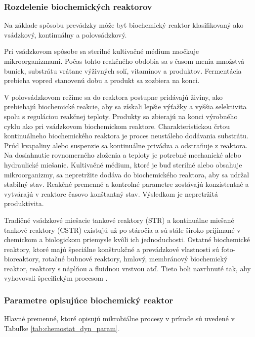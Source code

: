 \subsubsection{Rozdelenie biochemických reaktorov}
Na základe spôsobu prevádzky môže byť biochemický reaktor klasifikovaný ako vsádzkový, kontinuálny a polovsádzkový.
 
Pri vsádzkovom spôsobe sa sterilné kultivačné médium naočkuje mikroorganizmami. Počas tohto reakčného obdobia sa s časom menia množstvá buniek, substrátu vrátane výživných solí, vitamínov a produktov. Fermentácia prebieha vopred stanovenú dobu a produkt sa zozbiera na konci.

V polovsádzkovom režime sa do reaktora postupne pridávajú živiny, ako prebiehajú biochemické reakcie, aby sa získali lepšie výťažky a vyššia selektivita spolu s reguláciou reakčnej teploty. Produkty sa zbierajú na konci výrobného cyklu ako pri vsádzkovom biochemickom reaktore. Charakteristickou črtou kontinuálneho biochemického reaktora je proces neustáleho dodávania substrátu. Prúd kvapaliny alebo suspenzie sa kontinuálne privádza a odstraňuje z reaktora. Na dosiahnutie rovnomerného zloženia a teploty je potrebné mechanické alebo hydraulické miešanie. Kultivačné médium, ktoré je buď sterilné alebo obsahuje mikroorganizmy, sa nepretržite dodáva do biochemického reaktora, aby sa udržal stabilný stav. Reakčné premenné a kontrolné parametre zostávajú konzistentné a vytvárajú v reaktore časovo konštantný stav. Výsledkom je nepretržitá produktivita.

Tradičné vsádzkové miešacie tankové reaktory (STR) a kontinuálne miešané tankové reaktory (CSTR) existujú už po stáročia a sú stále široko prijímané v chemickom a biologickom priemysle kvôli ich jednoduchosti. Ostatné biochemické reaktory, ktoré majú špeciálne konštrukčné a prevádzkové vlastnosti sú foto-bioreaktory, rotačné bubnové reaktory, hmlový, membránový biochemický reaktor, reaktory s náplňou a fluidnou vrstvou atď. Tieto boli navrhnuté tak, aby vyhovovali špecifickým procesom \cite{kaushik:bioreactors:2014}.

\subsubsection{Parametre opisujúce biochemický reaktor}
Hlavné premenné, ktoré opisujú mikrobiálne procesy v prírode sú uvedené v Tabuľke \ref{tab:chemostat_dyn_param}.

